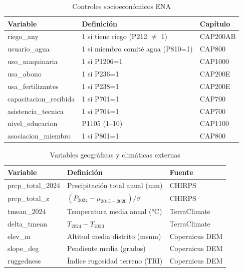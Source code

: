 \documentclass[11pt,a4paper]{article}
\begin{document}
\begin{table}[H]
\centering
\caption{Controles socioeconómicos ENA}
\label{tab:control_definitions}
\begin{threeparttable}
\small
\begin{tabular}{p{3.5cm}p{7cm}p{2.5cm}}
\toprule
\textbf{Variable} & \textbf{Definición} & \textbf{Capítulo} \\
\midrule
riego\_any & 1 si tiene riego (P212 $\neq$ 1) & CAP200AB \\
usuario\_agua & 1 si miembro comité agua (P810=1) & CAP800 \\
uso\_maquinaria & 1 si P1206=1 & CAP1000 \\
usa\_abono & 1 si P236=1 & CAP200E \\
usa\_fertilizantes & 1 si P238=1 & CAP200E \\
capacitacion\_recibida & 1 si P701=1 & CAP700 \\
asistencia\_tecnica & 1 si P704=1 & CAP700 \\
nivel\_educacion & P1105 (1--10) & CAP1100 \\
asociacion\_miembro & 1 si P801=1 & CAP800 \\
\bottomrule
\end{tabular}
\end{threeparttable}
\end{table}

\begin{table}[H]
\centering
\caption{Variables geográficas y climáticas externas}
\label{tab:geo_definitions}
\begin{threeparttable}
\small
\begin{tabular}{p{3.5cm}p{7cm}p{3cm}}
\toprule
\textbf{Variable} & \textbf{Definición} & \textbf{Fuente} \\
\midrule
prcp\_total\_2024 & Precipitación total anual (mm) & CHIRPS \\
prcp\_total\_z & $(P_{2024} - \mu_{2015-2020}) / \sigma$ & CHIRPS \\
tmean\_2024 & Temperatura media anual (°C) & TerraClimate \\
delta\_tmean & $T_{2024} - T_{2023}$ & TerraClimate \\
elev\_m & Altitud media distrito (msnm) & Copernicus DEM \\
slope\_deg & Pendiente media (grados) & Copernicus DEM \\
ruggedness & Índice rugosidad terreno (TRI) & Copernicus DEM \\
\bottomrule
\end{tabular}
\end{threeparttable}
\end{table}
\end{document}
